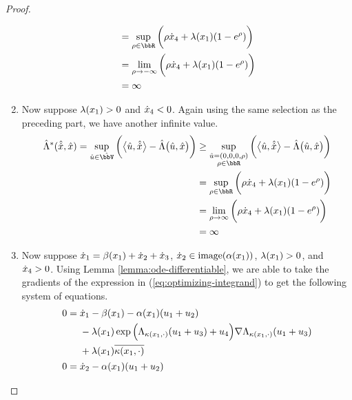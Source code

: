 \begin{proof}
\begin{enumerate}
\begin{align*}
        &= \sup_{\rho\in\bbR} \bigg( \rho\diffVar_4 + \affInt(\stateVar_1) (1 - e^\rho) \bigg) \\
        &= \lim_{\rho\rightarrow-\infty} \bigg( \rho\diffVar_4 + \affInt(\stateVar_1) (1 - e^\rho) \bigg) \\
        &= \infty
      \end{align*}
    \item
      Now suppose $\lambda(x_1) > 0$ and $\dot{x}_4 < 0$.
      Again using the same selection as the preceding part, we have another infinite value.
      \begin{align*}
        \hat\ode^*(\hat{\diffVar}, \hat\stateVar) 
        = \sup_{\hat\momentVar \in \hat\vecSpace} \bigg( \bprj{\hat\momentVar}{\hat\diffVar} - \hat\ode\big(\hat\momentVar, \hat\stateVar\big) \bigg) 
        &\geq \sup_{\substack{\hat\momentVar=(0, 0, 0, \rho)  \\ \rho \in \bbR}} \bigg( \bprj{\hat\momentVar}{\hat\diffVar} - \hat\ode\big(\hat\momentVar, \hat\stateVar\big) \bigg) \\
        &= \sup_{\rho\in\bbR} \bigg( \rho\diffVar_4 + \affInt(\stateVar_1) (1 - e^\rho) \bigg) \\
        &= \lim_{\rho\rightarrow\infty} \bigg( \rho\diffVar_4 + \affInt(\stateVar_1) (1 - e^\rho) \bigg) \\
        &= \infty
      \end{align*}
    \item
      Now suppose $\dot{x}_1 = \beta(x_1) + \dot{x}_2 + \dot{x}_3$, $\dot{x}_2 \in \operatorname{image}(\alpha(x_1))$, $\lambda(x_1) > 0$, and $\dot{x}_4 > 0$.
      Using Lemma \ref{lemma:ode-differentiable}, we are able to take the gradients of the expression in (\ref{eq:optimizing-integrand}) to get the following system of equations.
      \begin{align*}
        0 &= \begin{aligned}[t]
          &\diffVar_1 - \affDrift(\stateVar_1) - \affDiff(\stateVar_1) (\momentVar_1 + \momentVar_2) \\
          &- \affInt(\stateVar_1) \exp\Big( \ode_{\affDist(\stateVar_1,\cdot)}(\momentVar_1+\momentVar_3) + \momentVar_4\Big) \nabla\ode_{\affDist(\stateVar_1,\cdot)}(\momentVar_1+\momentVar_3) \\
          &+ \affInt(\stateVar_1) \overline{\affDist(\stateVar_1, \cdot)}
        \end{aligned} \\
        0 &= \diffVar_2 - \affDiff(\stateVar_1) ( \momentVar_1 + \momentVar_2 ) \\

\end{align*}
\end{enumerate}
\end{proof}
